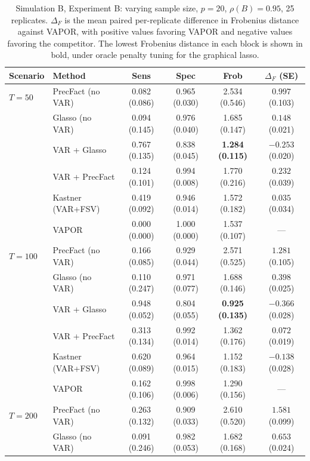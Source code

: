 \begin{table}[h!]
\centering
\small
\setlength{\tabcolsep}{4pt}
\caption{Simulation B, Experiment B: varying sample size, $p=20$, $\rho(B)=0.95$, 25 replicates. $\Delta_F$ is the mean paired per-replicate difference in Frobenius distance against VAPOR, with positive values favoring VAPOR and negative values favoring the competitor. The lowest Frobenius distance in each block is shown in bold, under oracle penalty tuning for the graphical lasso.}
\label{tab:sim-b-samplesize}
\begin{tabular}{llcccc}
\toprule
Scenario & Method & Sens & Spec & Frob & $\Delta_F$ (SE) \\
\midrule
$T = 50$   & PrecFact (no VAR)  & 0.082 (0.086) & 0.965 (0.030) & 2.534 (0.546) & $0.997$ (0.103) \\
           & Glasso (no VAR)    & 0.094 (0.145) & 0.976 (0.040) & 1.685 (0.147) & $0.148$ (0.021) \\
           & VAR + Glasso       & 0.767 (0.135) & 0.838 (0.045) & \textbf{1.284 (0.115)} & $-0.253$ (0.020) \\
           & VAR + PrecFact     & 0.124 (0.101) & 0.994 (0.008) & 1.770 (0.216) & $0.232$ (0.039) \\
           & Kastner (VAR+FSV)  & 0.419 (0.092) & 0.946 (0.014) & 1.572 (0.182) & $0.035$ (0.034) \\
           & VAPOR              & 0.000 (0.000) & 1.000 (0.000) & 1.537 (0.107) & --- \\
\midrule
$T = 100$  & PrecFact (no VAR)  & 0.166 (0.085) & 0.929 (0.044) & 2.571 (0.525) & $1.281$ (0.105) \\
           & Glasso (no VAR)    & 0.110 (0.247) & 0.971 (0.077) & 1.688 (0.146) & $0.398$ (0.025) \\
           & VAR + Glasso       & 0.948 (0.052) & 0.804 (0.055) & \textbf{0.925 (0.135)} & $-0.366$ (0.028) \\
           & VAR + PrecFact     & 0.313 (0.134) & 0.992 (0.014) & 1.362 (0.176) & $0.072$ (0.019) \\
           & Kastner (VAR+FSV)  & 0.620 (0.089) & 0.964 (0.015) & 1.152 (0.183) & $-0.138$ (0.028) \\
           & VAPOR              & 0.162 (0.106) & 0.998 (0.006) & 1.290 (0.156) & --- \\
\midrule
$T = 200$  & PrecFact (no VAR)  & 0.263 (0.132) & 0.909 (0.033) & 2.610 (0.520) & $1.581$ (0.099) \\
           & Glasso (no VAR)    & 0.091 (0.246) & 0.982 (0.053) & 1.682 (0.168) & $0.653$ (0.024) \\

\end{tabular}
\end{table}
